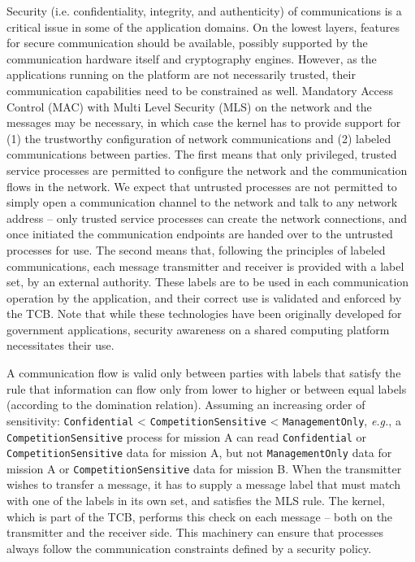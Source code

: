 Security (i.e. confidentiality, integrity, and authenticity) 
of communications is a critical issue in some of the application domains. 
On the lowest layers, features for secure communication should
be available, possibly supported by the communication hardware
itself and cryptography engines. However, as the
applications running on the platform are not necessarily trusted,
their communication capabilities need to be constrained as
well. Mandatory Access Control (MAC) with Multi Level Security (MLS)
\cite{BellLaPadula} on the network and the messages may be necessary,
in which case the kernel has to provide support for (1) the
trustworthy configuration of network communications and (2) labeled
communications between parties.  The first means that only privileged,
trusted service processes are permitted to configure the network and
the communication flows in the network. We expect that untrusted
processes are not permitted to simply open a communication channel to the network and
talk to any network address -- only trusted service processes can
create the network connections, and once initiated the
communication endpoints are handed over to the untrusted processes for use. The
second means that, following the principles of labeled communications,
each message transmitter and receiver is provided with a label set, by
an external authority. These labels are to be used in each communication
operation by the application, and their correct use is validated and enforced 
by the TCB.  Note that while these technologies have been 
originally developed for government applications, security awareness on a 
shared computing platform necessitates their use.

A communication flow is valid only between parties with labels that
satisfy the rule that information can flow only from lower to
higher or between equal labels (according to the domination relation). 
Assuming an increasing order of sensitivity: \texttt{Confidential} <
\texttt{CompetitionSensitive} < \texttt{ManagementOnly}, 
\emph{e.g.}, a \texttt{CompetitionSensitive} process for mission A can read \texttt{Confidential} or
\texttt{CompetitionSensitive} data for mission A, but not  \texttt{ManagementOnly} data for mission A or
\texttt{CompetitionSensitive} data for mission B.  When the transmitter wishes to transfer a
message, it has to supply a message label that must match with one of
the labels in its own set, and satisfies the MLS rule. The kernel,
which is part of the TCB, performs this check on each message -- both
on the transmitter and the receiver side. This machinery can ensure
that processes always follow the communication constraints defined by
a security policy.


